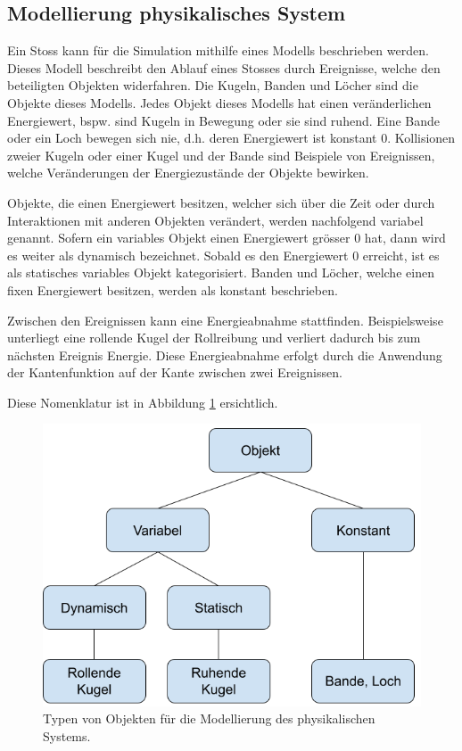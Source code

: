 \newpage
\subsection{Modellierung physikalisches System}\label{kap:physikalisches_system}
Ein Stoss kann für die Simulation mithilfe eines Modells beschrieben werden.
Dieses Modell beschreibt den Ablauf eines Stosses durch Ereignisse, welche den beteiligten Objekten widerfahren.
Die Kugeln, Banden und Löcher sind die Objekte dieses Modells.
Jedes Objekt dieses Modells hat einen veränderlichen Energiewert, bspw. sind Kugeln in Bewegung oder sie sind ruhend.
Eine Bande oder ein Loch bewegen sich nie, d.h. deren Energiewert ist konstant 0.
Kollisionen zweier Kugeln oder einer Kugel und der Bande sind Beispiele von Ereignissen, welche Veränderungen
der Energiezustände der Objekte bewirken.

Objekte, die einen Energiewert besitzen, welcher sich über die Zeit oder durch Interaktionen mit anderen Objekten verändert,
werden nachfolgend variabel genannt. Sofern ein variables Objekt einen Energiewert grösser 0 hat,
dann wird es weiter als dynamisch bezeichnet. Sobald es den Energiewert 0 erreicht, ist es als statisches
variables Objekt kategorisiert.
Banden und Löcher, welche einen fixen Energiewert besitzen, werden als konstant beschrieben.

Zwischen den Ereignissen kann eine Energieabnahme stattfinden. Beispielsweise unterliegt eine rollende Kugel der
Rollreibung und verliert dadurch bis zum nächsten Ereignis Energie.
Diese Energieabnahme erfolgt durch die Anwendung der Kantenfunktion auf der Kante zwischen zwei Ereignissen.

Diese Nomenklatur ist in Abbildung \ref{fig:physical_model_object_categories} ersichtlich.

\begin{figure}[h!]
    \begin{center}
        \includegraphics[width=0.5\linewidth]{../common/03_billiard_ai/resources/17_physical_model_categories.png}
    \end{center}
    \caption{Typen von Objekten für die Modellierung des physikalischen Systems.}
    \label{fig:physical_model_object_categories}
\end{figure}

